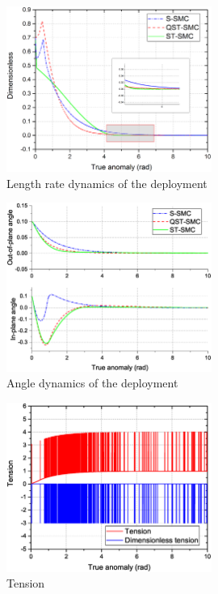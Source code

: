 \documentclass[Journal,letterpaper]{ascelike-new}
\theoremstyle{plain}
\theoremstyle{remark}
\begin{document}
\begin{figure}
\centering
\includegraphics[width=0.6\textwidth]{paper4_fig4.eps}
\caption{Length rate dynamics of the deployment}
\label{fig:4}
\end{figure}
\begin{figure}
\centering
\includegraphics[width=0.6\textwidth]{paper4_fig5.eps}
\caption{Angle dynamics of the deployment}
\label{fig:5}
\end{figure}
\begin{figure}
\centering
\includegraphics[width=0.6\textwidth]{paper4_fig6.eps}
\caption{Tension}
\label{fig:6}
\end{figure}
\end{document}
